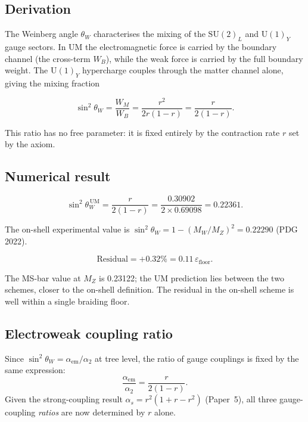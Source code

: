 \documentclass[12pt]{article}
\begin{document}
\subsection{Derivation}

The Weinberg angle $\theta_W$ characterises the mixing of the
$\mathrm{SU}(2)_L$ and $\mathrm{U}(1)_Y$ gauge sectors. In UM the
electromagnetic force is carried by the boundary channel (the
cross-term $W_B$), while the weak force is carried by the full
boundary weight. The $\mathrm{U}(1)_Y$ hypercharge couples through
the matter channel alone, giving the mixing fraction

\begin{equation}
  \sin^2\!\theta_W
    = \frac{W_M}{W_B}
    = \frac{r^2}{2r(1-r)}
    = \frac{r}{2(1-r)}.
  \label{eq:sw2}
\end{equation}

This ratio has no free parameter: it is fixed entirely by the
contraction rate $r$ set by the axiom.

\subsection{Numerical result}

\begin{equation}
  \sin^2\!\theta_W^{\,\text{UM}} = \frac{r}{2(1-r)}
    = \frac{0.30902}{2 \times 0.69098} = 0.22361.
\end{equation}

The on-shell experimental value is
$\sin^2\!\theta_W = 1 - (M_W/M_Z)^2 = 0.22290$ (PDG 2022).

\[
  \text{Residual} = +0.32\% = 0.11\,\varepsilon_{\text{floor}}.
\]

The MS-bar value at $M_Z$ is 0.23122; the UM prediction lies
between the two schemes, closer to the on-shell definition. The
residual in the on-shell scheme is well within a single braiding
floor.

\subsection{Electroweak coupling ratio}

Since $\sin^2\!\theta_W = \alpha_{\text{em}}/\alpha_2$ at tree
level, the ratio of gauge couplings is fixed by the same expression:
\begin{equation}
  \frac{\alpha_{\text{em}}}{\alpha_2} = \frac{r}{2(1-r)}.
  \label{eq:ratio}
\end{equation}
Given the strong-coupling result $\alpha_s = r^2(1+r-r^2)$
(Paper~5), all three gauge-coupling \emph{ratios} are now determined
by $r$ alone.
\end{document}
